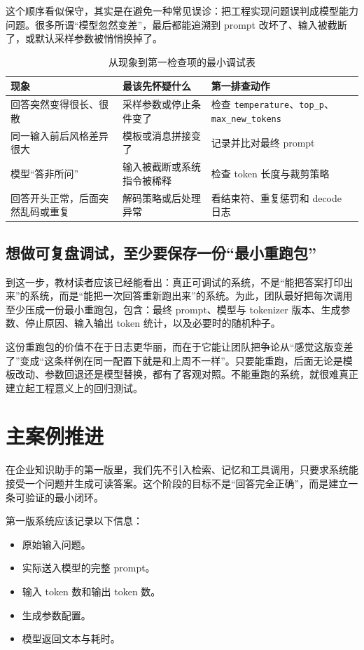 这个顺序看似保守，其实是在避免一种常见误诊：把工程实现问题误判成模型能力问题。很多所谓“模型忽然变差”，最后都能追溯到 prompt 改坏了、输入被截断了，或默认采样参数被悄悄换掉了。

\begin{table}[H]
\centering
\small
\begin{tabularx}{\textwidth}{>{\raggedright\arraybackslash}p{3.2cm}>{\raggedright\arraybackslash}p{3.8cm}>{\raggedright\arraybackslash}X}
\toprule
\textbf{现象} & \textbf{最该先怀疑什么} & \textbf{第一排查动作} \\
\midrule
回答突然变得很长、很散 & 采样参数或停止条件变了 & 检查 \texttt{temperature}、\texttt{top\_p}、\texttt{max\_new\_tokens} \\
同一输入前后风格差异很大 & 模板或消息拼接变了 & 记录并比对最终 prompt \\
模型“答非所问” & 输入被截断或系统指令被稀释 & 检查 token 长度与裁剪策略 \\
回答开头正常，后面突然乱码或重复 & 解码策略或后处理异常 & 看结束符、重复惩罚和 decode 日志 \\
\bottomrule
\end{tabularx}
\caption{从现象到第一检查项的最小调试表}
\label{tab:inference-debug-routing}
\end{table}

\subsection{想做可复盘调试，至少要保存一份“最小重跑包”}
到这一步，教材读者应该已经能看出：真正可调试的系统，不是“能把答案打印出来”的系统，而是“能把一次回答重新跑出来”的系统。为此，团队最好把每次调用至少压成一份最小重跑包，包含：最终 prompt、模型与 tokenizer 版本、生成参数、停止原因、输入输出 token 统计，以及必要时的随机种子。

这份重跑包的价值不在于日志更华丽，而在于它能让团队把争论从“感觉这版变差了”变成“这条样例在同一配置下就是和上周不一样”。只要能重跑，后面无论是模板改动、参数回退还是模型替换，都有了客观对照。不能重跑的系统，就很难真正建立起工程意义上的回归测试。

\section{主案例推进}
在企业知识助手的第一版里，我们先不引入检索、记忆和工具调用，只要求系统能接受一个问题并生成可读答案。这个阶段的目标不是“回答完全正确”，而是建立一条可验证的最小闭环。

第一版系统应该记录以下信息：
\begin{itemize}
  \item 原始输入问题。
  \item 实际送入模型的完整 prompt。
  \item 输入 token 数和输出 token 数。
  \item 生成参数配置。
  \item 模型返回文本与耗时。
\end{itemize}

